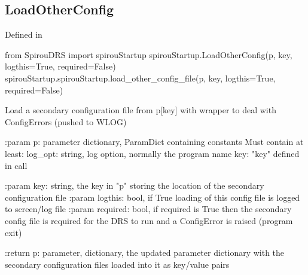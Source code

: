 \noindent\begin{minipage}{\textwidth}
\subsection{LoadOtherConfig}

Defined in \spirouStartup{}

\begin{pythonbox}
from SpirouDRS import spirouStartup
spirouStartup.LoadOtherConfig(p, key, logthis=True, required=False)
spirouStartup.spirouStartup.load_other_config_file(p, key, logthis=True, required=False)
\end{pythonbox}

\begin{pythondocstring}
Load a secondary configuration file from p[key] with wrapper to deal
with ConfigErrors (pushed to WLOG)

:param p: parameter dictionary, ParamDict containing constants
    Must contain at least:
            log_opt: string, log option, normally the program name
            key: "key" defined in call

:param key: string, the key in "p" storing the location of the secondary
            configuration file
:param logthis: bool, if True loading of this config file is logged to
                screen/log file
:param required: bool, if required is True then the secondary config file
                 is required for the DRS to run and a ConfigError is raised
                 (program exit)

:return p: parameter, dictionary, the updated parameter dictionary with
           the secondary configuration files loaded into it as key/value
           pairs
\end{pythondocstring}
\end{minipage}




